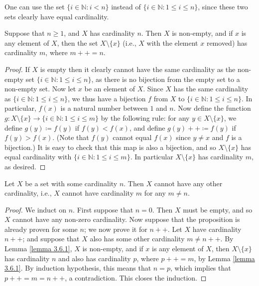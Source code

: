 \begin{remark}
One can use the set \(\{i \in \mathds{N} : i < n\}\) instead of \(\{i \in \mathds{N} : 1 \leq i \leq n\}\), since these two sets clearly have equal cardinality.
\end{remark}

\begin{lemma}\label{lemma 3.6.1}
Suppose that \(n \geq 1\), and \(X\) has cardinality \(n\).
Then \(X\) is non-empty, and if \(x\) is any element of \(X\), then the set \(X \setminus \{x\}\) (i.e., \(X\) with the element \(x\) removed) has cardinality \(m\), where \(m++ = n\).
\end{lemma}

\begin{proof}
If \(X\) is empty then it clearly cannot have the same cardinality as the non-empty set \(\{i \in \mathds{N} : 1 \leq i \leq n\}\), as there is no bijection from the empty set to a non-empty set.
Now let \(x\) be an element of \(X\).
Since \(X\) has the same cardinality as \(\{i \in \mathds{N} : 1 \leq i \leq n\}\), we thus have a bijection \(f\) from \(X\) to \(\{i \in \mathds{N} : 1 \leq i \leq n\}\).
In particular, \(f(x)\) is a natural number between \(1\) and \(n\).
Now define the function \(g : X \setminus \{x\} \to \{i \in \mathds{N} : 1 \leq i \leq m\}\) by the following rule: for any \(y \in X \setminus \{x\}\), we define \(g(y) \coloneqq f(y)\) if \(f(y) < f(x)\), and define \(g(y)++ \coloneqq f(y)\) if \(f(y) > f(x)\).
(Note that \(f(y)\) cannot equal \(f(x)\) since \(y \neq x\) and \(f\) is a bijection.)
It is easy to check that this map is also a bijection, and so \(X \setminus \{x\}\) has equal cardinality with \(\{i \in \mathds{N} : 1 \leq i \leq m\}\).
In particular \(X \setminus \{x\}\) has cardinality \(m\), as desired.
\end{proof}

\begin{proposition}\label{proposition 3.6.2}
Let \(X\) be a set with some cardinality \(n\).
Then \(X\) cannot have any other cardinality, i.e., \(X\) cannot have cardinality \(m\) for any \(m \neq n\).
\end{proposition}

\begin{proof}
We induct on \(n\).
First suppose that \(n = 0\).
Then \(X\) must be empty, and so \(X\) cannot have any non-zero cardinality.
Now suppose that the proposition is already proven for some \(n\);
we now prove it for \(n++\).
Let \(X\) have cardinality \(n++\);
and suppose that \(X\) also has some other cardinality \(m \neq n++\).
By Lemma \ref{lemma 3.6.1}, \(X\) is non-empty, and if \(x\) is any element of \(X\), then \(X \setminus \{x\}\) has cardinality \(n\) and also has cardinality \(p\), where \(p++ = m\), by Lemma \ref{lemma 3.6.1}.
By induction hypothesis, this means that \(n = p\), which implies that \(p++ = m = n++\), a contradiction.
This closes the induction.
\end{proof}

